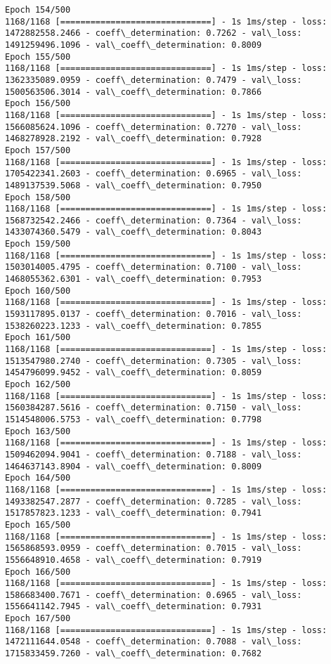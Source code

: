 \documentclass[11pt]{article}
\begin{document}
\begin{Verbatim}[commandchars=\\\{\}]
Epoch 154/500
1168/1168 [==============================] - 1s 1ms/step - loss: 1472882558.2466 - coeff\_determination: 0.7262 - val\_loss: 1491259496.1096 - val\_coeff\_determination: 0.8009
Epoch 155/500
1168/1168 [==============================] - 1s 1ms/step - loss: 1362335089.0959 - coeff\_determination: 0.7479 - val\_loss: 1500563506.3014 - val\_coeff\_determination: 0.7866
Epoch 156/500
1168/1168 [==============================] - 1s 1ms/step - loss: 1566085624.1096 - coeff\_determination: 0.7270 - val\_loss: 1468278928.2192 - val\_coeff\_determination: 0.7928
Epoch 157/500
1168/1168 [==============================] - 1s 1ms/step - loss: 1705422341.2603 - coeff\_determination: 0.6965 - val\_loss: 1489137539.5068 - val\_coeff\_determination: 0.7950
Epoch 158/500
1168/1168 [==============================] - 1s 1ms/step - loss: 1568732542.2466 - coeff\_determination: 0.7364 - val\_loss: 1433074360.5479 - val\_coeff\_determination: 0.8043
Epoch 159/500
1168/1168 [==============================] - 1s 1ms/step - loss: 1503014005.4795 - coeff\_determination: 0.7100 - val\_loss: 1468055362.6301 - val\_coeff\_determination: 0.7953
Epoch 160/500
1168/1168 [==============================] - 1s 1ms/step - loss: 1593117895.0137 - coeff\_determination: 0.7016 - val\_loss: 1538260223.1233 - val\_coeff\_determination: 0.7855
Epoch 161/500
1168/1168 [==============================] - 1s 1ms/step - loss: 1513547980.2740 - coeff\_determination: 0.7305 - val\_loss: 1454796099.9452 - val\_coeff\_determination: 0.8059
Epoch 162/500
1168/1168 [==============================] - 1s 1ms/step - loss: 1560384287.5616 - coeff\_determination: 0.7150 - val\_loss: 1514548006.5753 - val\_coeff\_determination: 0.7798
Epoch 163/500
1168/1168 [==============================] - 1s 1ms/step - loss: 1509462094.9041 - coeff\_determination: 0.7188 - val\_loss: 1464637143.8904 - val\_coeff\_determination: 0.8009
Epoch 164/500
1168/1168 [==============================] - 1s 1ms/step - loss: 1493382547.2877 - coeff\_determination: 0.7285 - val\_loss: 1517857823.1233 - val\_coeff\_determination: 0.7941
Epoch 165/500
1168/1168 [==============================] - 1s 1ms/step - loss: 1565868593.0959 - coeff\_determination: 0.7015 - val\_loss: 1556648910.4658 - val\_coeff\_determination: 0.7919
Epoch 166/500
1168/1168 [==============================] - 1s 1ms/step - loss: 1586683400.7671 - coeff\_determination: 0.6965 - val\_loss: 1556641142.7945 - val\_coeff\_determination: 0.7931
Epoch 167/500
1168/1168 [==============================] - 1s 1ms/step - loss: 1472111644.0548 - coeff\_determination: 0.7088 - val\_loss: 1715833459.7260 - val\_coeff\_determination: 0.7682

\end{Verbatim}
\end{document}
